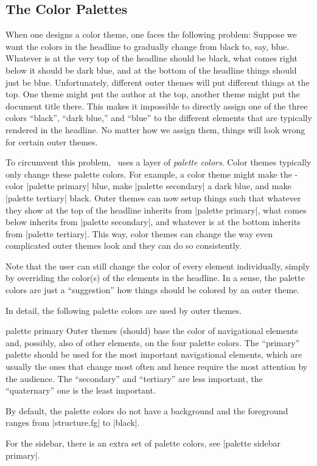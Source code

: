 \subsection{The Color Palettes}

When one designs a color theme, one faces the following problem: Suppose we want the colors in the headline to gradually change from black to, say, blue. Whatever is at the very top of the headline should be black, what comes right below it should be dark blue, and at the bottom of the headline things should just be blue. Unfortunately, different outer themes will put different things at the top. One theme might put the author at the top, another theme might put the document title there. This makes it impossible to directly assign one of the three colors ``black'', ``dark blue,'' and ``blue'' to the different elements that are typically rendered in the headline. No matter how we assign them, things will look wrong for certain outer themes.

To circumvent this problem, \beamer\ uses a layer of \emph{palette colors}. Color themes typically only change these palette colors. For example, a color theme might make the \beamer-color |palette primary| blue, make |palette secondary| a dark blue, and make |palette tertiary| black. Outer themes can now setup things such that whatever they show at the top of the headline inherits from |palette primary|, what comes below inherits from |palette secondary|, and whatever is at the bottom inherits from |palette tertiary|. This way, color themes can change the way even complicated outer themes look and they can do so consistently.

Note that the user can still change the color of every element individually, simply by overriding the color(s) of the elements in the headline. In a sense, the palette colors are just a ``suggestion'' how things should be colored by an outer theme.

In detail, the following palette colors are used by outer themes.

\begin{element}{palette primary}\no\yes\no
  Outer themes (should) base the color of navigational elements and, possibly, also of other elements, on the four palette colors. The ``primary'' palette should be used for the most important navigational elements, which are usually the ones that change most often and hence require the most attention by the audience. The ``secondary'' and ``tertiary'' are less important, the ``quaternary'' one is the least important.

  By default, the palette colors do not have a background and the foreground ranges from |structure.fg| to |black|.

  For the sidebar, there is an extra set of palette colors, see |palette sidebar primary|.
\end{element}


